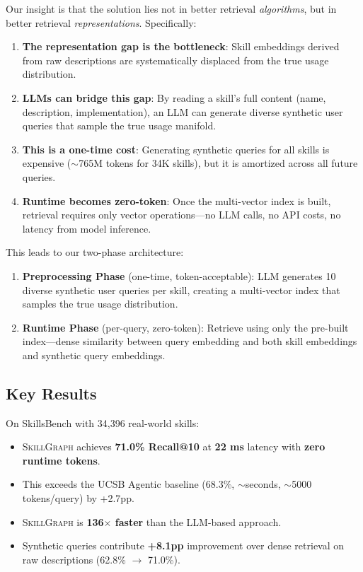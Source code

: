 \documentclass[11pt,a4paper]{article}
\newcommand{\ours}{\textsc{SkillGraph}}
\newcommand{\ucsb}{\textsc{UCSB}}
\begin{document}
Our insight is that the solution lies not in better retrieval \emph{algorithms}, but in better retrieval \emph{representations}. Specifically:

\begin{enumerate}
  \item \textbf{The representation gap is the bottleneck}: Skill embeddings derived from raw descriptions are systematically displaced from the true usage distribution.
  \item \textbf{LLMs can bridge this gap}: By reading a skill's full content (name, description, implementation), an LLM can generate diverse synthetic user queries that sample the true usage manifold.
  \item \textbf{This is a one-time cost}: Generating synthetic queries for all skills is expensive ($\sim$765M tokens for 34K skills), but it is amortized across all future queries.
  \item \textbf{Runtime becomes zero-token}: Once the multi-vector index is built, retrieval requires only vector operations---no LLM calls, no API costs, no latency from model inference.
\end{enumerate}

This leads to our two-phase architecture:

\begin{enumerate}
  \item \textbf{Preprocessing Phase} (one-time, token-acceptable): LLM generates 10 diverse synthetic user queries per skill, creating a multi-vector index that samples the true usage distribution.
  \item \textbf{Runtime Phase} (per-query, zero-token): Retrieve using only the pre-built index---dense similarity between query embedding and both skill embeddings and synthetic query embeddings.
\end{enumerate}

\subsection{Key Results}

On SkillsBench \citep{ucsb2026} with 34,396 real-world skills:

\begin{itemize}
  \item \ours{} achieves \textbf{71.0\% Recall@10} at \textbf{22 ms} latency with \textbf{zero runtime tokens}.
  \item This exceeds the \ucsb{} Agentic baseline (68.3\%, $\sim$seconds, $\sim$5000 tokens/query) by +2.7pp.
  \item \ours{} is \textbf{136$\times$ faster} than the LLM-based approach.
  \item Synthetic queries contribute \textbf{+8.1pp} improvement over dense retrieval on raw descriptions (62.8\% $\rightarrow$ 71.0\%).
\end{itemize}
\end{document}
